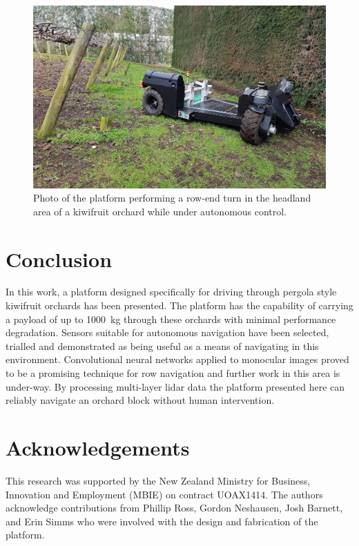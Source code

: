 \documentclass[preprint,authoryear,12pt]{elsarticle}
\begin{document}
    \begin{figure}[htb]
        \centering
        \includegraphics[width=\linewidth]{imgs/photos/suzy_turning.jpg}
        \caption{
            Photo of the platform performing a row-end turn in the headland area of a kiwifruit orchard while under autonomous control.
        }
        \label{fig:suzy_turning}
    \end{figure}


\section{Conclusion}
    In this work, a platform designed specifically for driving through pergola style kiwifruit orchards has been presented.
    The platform has the capability of carrying a payload of up to \SI{1000}{\kilo\gram} through these orchards with minimal performance degradation.
    Sensors suitable for autonomous navigation have been selected, trialled and demonstrated as being useful as a means of navigating in this environment.
    Convolutional neural networks applied to monocular images proved to be a promising technique for row navigation and further work in this area is under-way.
    By processing multi-layer lidar data the platform presented here can reliably navigate an orchard block without human intervention.


\section*{Acknowledgements}
This research was supported by the New Zealand Ministry for Business, Innovation and Employment (MBIE) on contract UOAX1414.
The authors acknowledge contributions from Phillip Ross, Gordon Neshausen, Josh Barnett, and Erin Simms who were involved with the design and fabrication of the platform.
\end{document}

